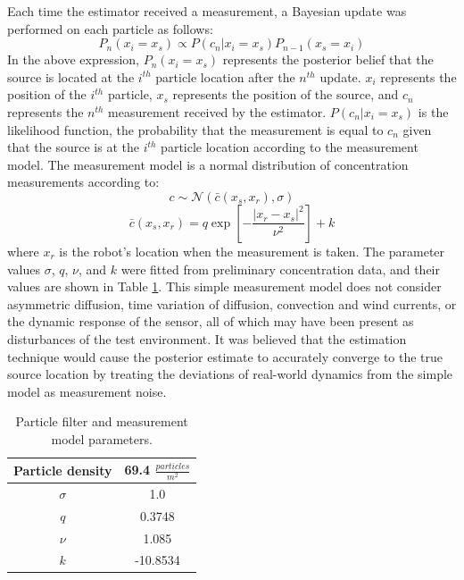 \documentclass[submit, 12pt]{aiaa-pretty-modified}
\begin{document}
Each time the estimator received a
measurement, a Bayesian update was performed on each particle
as follows: 
\[P_n(x_i = x_s) \propto P(c_n | x_i = x_s) P_{n-1}(x_s = x_i)\]
In the above expression, $P_n(x_i = x_s)$ represents the posterior belief that the source is located at the
$i^{th}$ particle location after the $n^{th}$ update.  $x_i$
represents the position of the $i^{th}$ particle, $x_s$ represents the
position of the source, and $c_n$ represents
the $n^{th}$ measurement received by the estimator. $P(c_n | x_i =
x_s)$ is the likelihood function, the probability that the measurement
is equal to $c_n$ given that the source is at the $i^{th}$ particle location according to
the measurement model. The measurement model is a normal
distribution of concentration
measurements according to: 
\[c \sim \mathcal{N}\left(\bar{c}(x_s,x_r), \sigma \right)\]
\[\bar{c}(x_s,x_r) = q \exp{\left[-\frac{|x_r - x_s|^2}{\nu^2}\right]} + k\]
where $x_r$ is the robot's location when the measurement is taken. The parameter
values $\sigma$, $q$, $\nu$, and $k$ were fitted from preliminary
concentration data, and their values are shown in Table
\ref{tab:estimator-parameters}.  This simple measurement model does
not consider asymmetric
diffusion, time variation of diffusion, convection and wind currents, or the dynamic response of the
sensor, all of which may have been present as disturbances of the test environment. It was believed that the estimation technique would
cause the posterior estimate to accurately converge to the true source location by
treating the deviations of real-world
dynamics from the simple model as measurement noise.

\begin{table}
\caption[Estimator parameters]{Particle filter and measurement model parameters.}
\begin{center}
\begin{tabular}{|c|c|}
\hline
Particle density & 69.4 $\frac{particles}{m^2}$ \\ \hline
$\sigma$ & 1.0 \\ \hline
$q$ & 0.3748 \\ \hline
$\nu$ & 1.085  \\ \hline
$k$ & -10.8534  \\ \hline
\end{tabular}
\end{center}
\label{tab:estimator-parameters}
\end{table}
\end{document}

